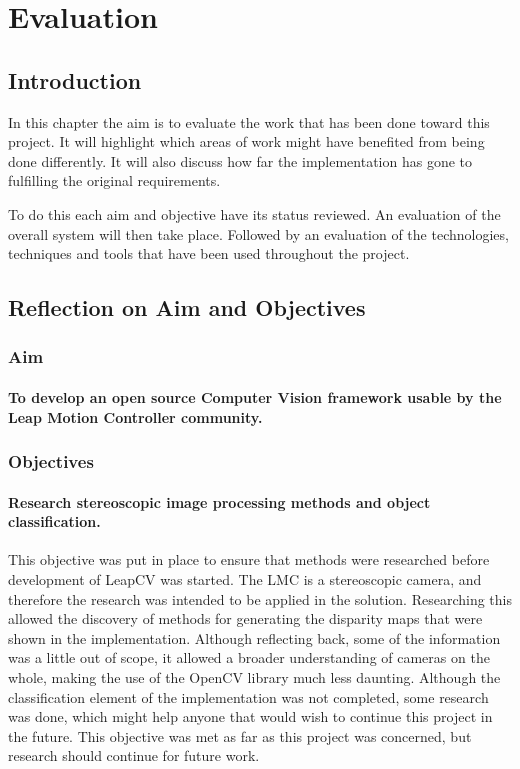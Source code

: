 \documentclass[11pt,oneside]{report}
\begin{document}
	\chapter{Evaluation}\label{chap:eval}
	\section{Introduction}
	In this chapter the aim is to evaluate the work that has been done toward this project.
	It will highlight which areas of work might have benefited from being done differently.
	It will also discuss how far the implementation has gone to fulfilling the original requirements.
	
	To do this each aim and objective have its status reviewed.
	An evaluation of the overall system will then take place.
	Followed by an evaluation of the technologies, techniques and tools that have been used throughout the project.

	\section{Reflection on Aim and Objectives}
	\subsection{Aim}
		\subsubsection{To develop an open source Computer Vision framework usable by the Leap Motion Controller community.}
	\subsection{Objectives} 
		\subsubsection{Research stereoscopic image processing methods and object classification.}
		This objective was put in place to ensure that methods were researched before development of LeapCV was started.
		The LMC is a stereoscopic camera, and therefore the research was intended to be applied in the solution.
		Researching this allowed the discovery of methods for generating the disparity maps that were shown in the implementation.
		Although reflecting back, some of the information was a little out of scope, it allowed a broader understanding of cameras on the whole, making the use of the OpenCV library much less daunting.
		Although the classification element of the implementation was not completed, some research was done, which might help anyone that would wish to continue this project in the future.
		This objective was met as far as this project was concerned, but research should continue for future work.
\end{document}
